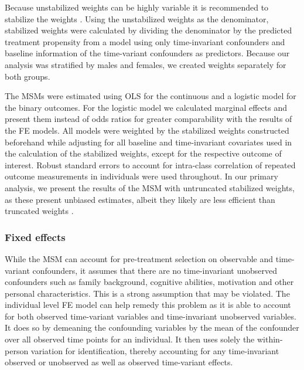 Because unstabilized weights can be highly variable it is recommended to stabilize the weights \parencite{Cole2008}. Using the unstabilized weights as the denominator, stabilized weights were calculated by dividing the denominator by the predicted treatment propensity from a model using only time-invariant confounders and baseline information of the time-variant confounders as predictors.  Because our analysis was stratified by males and females, we created weights separately for both groups.

The \acp{MSM} were estimated using \ac{OLS} for the continuous and a logistic model for the binary outcomes. For the logistic model we calculated marginal effects and present them instead of odds ratios for greater comparability with the results of the \ac{FE} models. All models were weighted by the stabilized weights constructed beforehand while adjusting for all baseline and time-invariant covariates used in the calculation of the stabilized weights, except for the respective outcome of interest. Robust standard errors to account for intra-class correlation of repeated outcome measurements in individuals were used throughout. In our primary analysis, we present the results of the \ac{MSM} with untruncated stabilized weights, as these present unbiased estimates, albeit they likely are less efficient than truncated weights \parencite{Cole2008}.

\subsubsection*{Fixed effects}

While the \ac{MSM} can account for pre-treatment selection on observable and time-variant confounders, it assumes that there are no time-invariant unobserved confounders such as family background, cognitive abilities, motivation and other personal characteristics. This is a strong assumption that may be violated. The individual level \ac{FE} model can help remedy this problem as it is able to account for both observed time-variant variables and time-invariant unobserved variables. It does so by demeaning the confounding variables by the mean of the confounder over all observed time points for an individual. It then uses solely the within-person variation for identification, thereby accounting for any time-invariant observed or unobserved as well as observed time-variant effects. 

